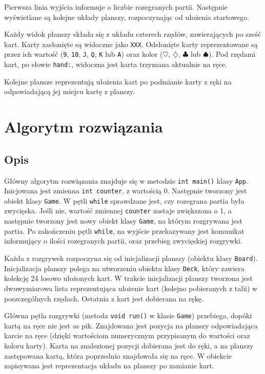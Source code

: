 \documentclass{article}
\begin{document}
Pierwsza linia wyjścia informuje o liczbie rozegranych partii. Następnie wyświetlane są kolejne układy planszy, rozpoczynając od ułożenia startowego.

Każdy widok planszy składa się z układu czterech rzędów, zawierających po sześć kart. Karty zasłonięte są widoczne jako \texttt{XXX}. Odsłonięte karty reprezentowane są przez ich wartość (\texttt{9}, \texttt{10}, \texttt{J}, \texttt{Q}, \texttt{K} lub \texttt{A}) oraz kolor (\texttt{$\heartsuit$}, \texttt{$\diamondsuit$}, \texttt{$\clubsuit$} lub \texttt{$\spadesuit$}). Pod rzędami kart, po słowie \texttt{hand:}, widoczna jest karta trzymana aktualnie na ręce.

Kolejne plansze reprezentują ułożenia kart po podmianie karty z ręki na odpowiadającą jej miejcu kartę z planszy.

\section{Algorytm rozwiązania}
\subsection{Opis}

Główny algorytm rozwiązania znajduje się w metodzie \texttt{int main()} klasy \texttt{App}. Inicjowana jest zmienna \texttt{int counter}, z wartością 0. Następnie tworzony jest obiekt klasy \texttt{Game}. W pętli \texttt{while} sprawdzane jest, czy rozegrana partia była zwycięska. Jeśli nie, wartość zmiennej \texttt{counter} zostaje zwiększona o 1, a następnie tworzony jest nowy obiekt klasy \texttt{Game}, na którym rozgrywana jest partia. Po zakończeniu pętli \texttt{while}, na wyjście przekazywany jest komunikat informujący o ilości rozegranych partii, oraz przebieg zwycięskiej rozgrywki.

Każda z rozgrywek rozpoczyna się od inicjalizacji planszy (obiektu klasy \texttt{Board}). Inicjalizacja planszy polega na utworzeniu obiektu klasy \texttt{Deck}, który zawiera kolekcję 24 losowo ułożonych kart. W trakcie inicjalizacji planszy tworzona jest dwuwymiarowa lista reprezentująca ułożenie kart (kolejno pobieranych z talii) w poszczególnych rzędach. Ostatnia z kart jest dobierana na rękę.

Główna pętla rozgrywki (metoda \texttt{void run()} w klasie \texttt{Game}) przebiega, dopóki kartą na ręce nie jest as pik. Znajdowana jest pozycja na planszy odpowiadająca karcie na ręce (dzięki wartościom numerycznym przypisanym do wartości oraz koloru karty). Karta na znalezionej pozycji dobierana jest do ręki, a na planszy zastępowana kartą, która poprzednio znajdowała się na ręce. W obiekcie zapisywana jest reprezentacja układu na planszy po zamianie kart.
\end{document}
